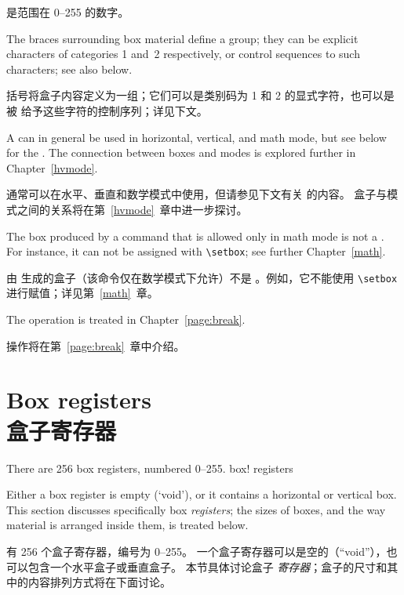 \documentclass[twoside,letterpaper]{rapport3}
\begin{document}
 是范围在 0--255 的数字。

The braces surrounding box material define a group;
they can be explicit characters
of categories 1 and~2 respectively,
or control sequences  to such characters;
see also below.

括号将盒子内容定义为一组；它们可以是类别码为 1 和 2 的显式字符，也可以是被  给予这些字符的控制序列；详见下文。


A  can in general be used in horizontal, vertical,
and math mode, but see below for the .
The connection between
boxes and modes is explored further in Chapter~\ref{hvmode}.

 通常可以在水平、垂直和数学模式中使用，但请参见下文有关  的内容。
盒子与模式之间的关系将在第~\ref{hvmode}~章中进一步探讨。


The box produced by  \ldash a command that is allowed only in
math mode \rdash  is not a . For instance,
it can not be assigned with \verb=\setbox=; see further
Chapter~\ref{math}.

由  生成的盒子（该命令仅在数学模式下允许）不是 。例如，它不能使用 \verb=\setbox= 进行赋值；详见第~\ref{math}~章。


The  operation is treated in Chapter~\ref{page:break}.

 操作将在第~\ref{page:break}~章中介绍。


\section{Box registers\\盒子寄存器}

There are 256 box registers, numbered 0--255. 
\term box! registers\par
Either a box register is  empty (`void'), or it contains a horizontal
or vertical box.
This section discusses specifically box {\em registers};
the sizes of boxes, and the way material is arranged inside them,
is treated below.
\awp

有 256 个盒子寄存器，编号为 0--255。
一个盒子寄存器可以是空的（“void”），也可以包含一个水平盒子或垂直盒子。
本节具体讨论盒子 {\em 寄存器}；盒子的尺寸和其中的内容排列方式将在下面讨论。
\end{document}
